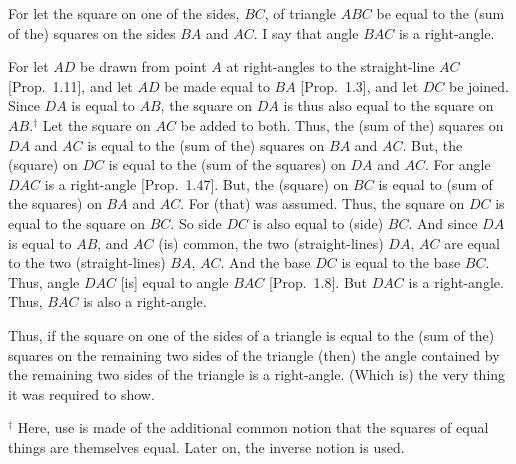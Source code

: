 \begin{Parallel}{}{}
{For let the square on one of the sides, $BC$, of triangle $ABC$ be equal
to the (sum of the) squares on the sides $BA$ and $AC$. I say that angle
$BAC$ is a right-angle.

\epsfysize=1.9in
\centerline{}

For let $AD$ be drawn from point $A$ at right-angles to the
straight-line $AC$ [Prop.~1.11], and let $AD$ be made equal to
$BA$ [Prop.~1.3], and let $DC$ be joined. Since $DA$ is equal to $AB$,
the square on $DA$ is thus also equal to the square on $AB$.$^\dag$ Let the square on
$AC$ be added to both. Thus, the (sum of the) squares on $DA$ and $AC$ is equal
to the (sum of the) squares on $BA$ and $AC$. But, the (square) on $DC$ 
is equal to the (sum of the squares) on $DA$ and $AC$. For angle $DAC$ is a right-angle [Prop.~1.47].
But, the  (square) on $BC$ is equal to (sum of the squares) on $BA$ and $AC$.
For (that) was assumed. Thus, the square on $DC$ is equal to the square on $BC$.
So  side $DC$ is also equal to (side) $BC$. And since $DA$ is equal to $AB$, and $AC$ (is) common, the two (straight-lines) $DA$, $AC$ are equal to the two (straight-lines)
$BA$, $AC$. And the base $DC$ is equal to the base $BC$. Thus, angle $DAC$ [is] equal to angle $BAC$ [Prop.~1.8].  But $DAC$ is a right-angle. Thus, $BAC$ is
also a right-angle.

Thus, if the square on one of the sides of a triangle is equal to the (sum of the)
squares on the remaining two sides of the triangle (then) the angle contained
by the remaining two sides of the triangle is a right-angle. (Which is) the very thing
it was required to show.}
\end{Parallel}
{\footnotesize \noindent$^\dag$ Here, use is made of the additional common notion that the squares of equal things are
themselves equal. Later on, the inverse notion is used.} 